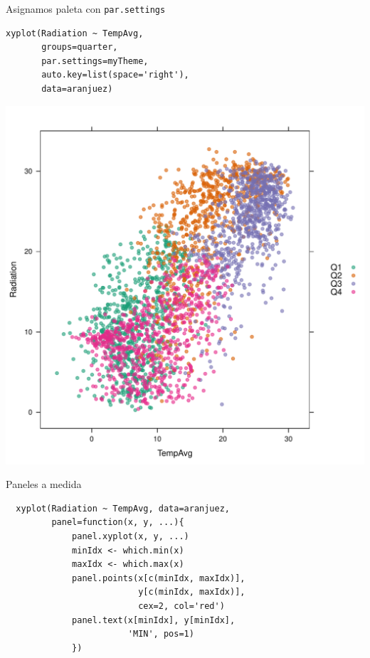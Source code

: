\documentclass[xcolor={usenames,svgnames,dvipsnames}]{beamer}
\begin{document}
\begin{frame}[fragile,label=sec-2-1-26]{Asignamos paleta con \texttt{par.settings}}
 \lstset{language=R,label= ,caption= ,numbers=none}
\begin{lstlisting}
xyplot(Radiation ~ TempAvg,
       groups=quarter,
       par.settings=myTheme,
       auto.key=list(space='right'),
       data=aranjuez)
\end{lstlisting}
\end{frame}

\begin{frame}[label=sec-2-1-27]{}
\includegraphics[width=.9\linewidth]{figs/brewer.pdf}
\end{frame}

\begin{frame}[fragile,label=sec-2-1-28]{Paneles a medida}
 \lstset{language=R,label= ,caption= ,numbers=none}
\begin{lstlisting}
  xyplot(Radiation ~ TempAvg, data=aranjuez,
         panel=function(x, y, ...){
             panel.xyplot(x, y, ...)
             minIdx <- which.min(x)
             maxIdx <- which.max(x)
             panel.points(x[c(minIdx, maxIdx)],
                          y[c(minIdx, maxIdx)],
                          cex=2, col='red')
             panel.text(x[minIdx], y[minIdx],
                        'MIN', pos=1)
             })
\end{lstlisting}
\end{frame}
\end{document}
